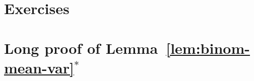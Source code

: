 %
%
%


\section{Exercises}


\newpage
\section*{Long proof of Lemma~\ref{lem:binom-mean-var}$^{*}$}

